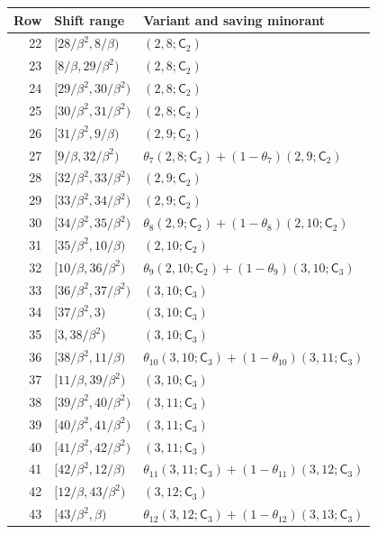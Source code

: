 \begin{center}\small
\begin{tabular}{rll}
\hline Row&Shift range&Variant and saving minorant\\\hline
22&$[28/\beta^2,8/\beta)$&$(2,8;\mathsf C_{2})$\\
23&$[8/\beta,29/\beta^2)$&$(2,8;\mathsf C_{2})$\\
24&$[29/\beta^2,30/\beta^2)$&$(2,8;\mathsf C_{2})$\\
25&$[30/\beta^2,31/\beta^2)$&$(2,8;\mathsf C_{2})$\\
26&$[31/\beta^2,9/\beta)$&$(2,9;\mathsf C_{2})$\\
27&$[9/\beta,32/\beta^2)$&$\theta_{7}(2,8;\mathsf C_{2})+(1-\theta_{7})(2,9;\mathsf C_{2})$\\
28&$[32/\beta^2,33/\beta^2)$&$(2,9;\mathsf C_{2})$\\
29&$[33/\beta^2,34/\beta^2)$&$(2,9;\mathsf C_{2})$\\
30&$[34/\beta^2,35/\beta^2)$&$\theta_{8}(2,9;\mathsf C_{2})+(1-\theta_{8})(2,10;\mathsf C_{2})$\\
31&$[35/\beta^2,10/\beta)$&$(2,10;\mathsf C_{2})$\\
32&$[10/\beta,36/\beta^2)$&$\theta_{9}(2,10;\mathsf C_{2})+(1-\theta_{9})(3,10;\mathsf C_{3})$\\
33&$[36/\beta^2,37/\beta^2)$&$(3,10;\mathsf C_{3})$\\
34&$[37/\beta^2,3)$&$(3,10;\mathsf C_{3})$\\
35&$[3,38/\beta^2)$&$(3,10;\mathsf C_{3})$\\
36&$[38/\beta^2,11/\beta)$&$\theta_{10}(3,10;\mathsf C_{3})+(1-\theta_{10})(3,11;\mathsf C_{3})$\\
37&$[11/\beta,39/\beta^2)$&$(3,10;\mathsf C_{3})$\\
38&$[39/\beta^2,40/\beta^2)$&$(3,11;\mathsf C_{3})$\\
39&$[40/\beta^2,41/\beta^2)$&$(3,11;\mathsf C_{3})$\\
40&$[41/\beta^2,42/\beta^2)$&$(3,11;\mathsf C_{3})$\\
41&$[42/\beta^2,12/\beta)$&$\theta_{11}(3,11;\mathsf C_{3})+(1-\theta_{11})(3,12;\mathsf C_{3})$\\
42&$[12/\beta,43/\beta^2)$&$(3,12;\mathsf C_{3})$\\
43&$[43/\beta^2,\beta)$&$\theta_{12}(3,12;\mathsf C_{3})+(1-\theta_{12})(3,13;\mathsf C_{3})$\\
\hline\end{tabular}\end{center}

